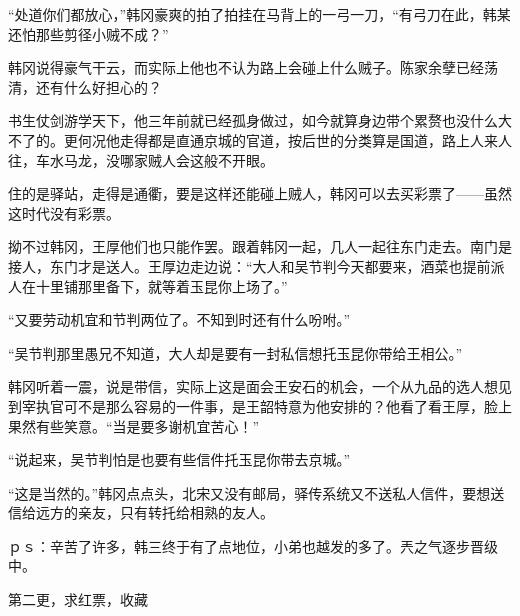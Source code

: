 “处道你们都放心，”韩冈豪爽的拍了拍挂在马背上的一弓一刀，“有弓刀在此，韩某还怕那些剪径小贼不成？”

韩冈说得豪气干云，而实际上他也不认为路上会碰上什么贼子。陈家余孽已经荡清，还有什么好担心的？

书生仗剑游学天下，他三年前就已经孤身做过，如今就算身边带个累赘也没什么大不了的。更何况他走得都是直通京城的官道，按后世的分类算是国道，路上人来人往，车水马龙，没哪家贼人会这般不开眼。

住的是驿站，走得是通衢，要是这样还能碰上贼人，韩冈可以去买彩票了——虽然这时代没有彩票。

拗不过韩冈，王厚他们也只能作罢。跟着韩冈一起，几人一起往东门走去。南门是接人，东门才是送人。王厚边走边说：“大人和吴节判今天都要来，酒菜也提前派人在十里铺那里备下，就等着玉昆你上场了。”

“又要劳动机宜和节判两位了。不知到时还有什么吩咐。”

“吴节判那里愚兄不知道，大人却是要有一封私信想托玉昆你带给王相公。”

韩冈听着一震，说是带信，实际上这是面会王安石的机会，一个从九品的选人想见到宰执官可不是那么容易的一件事，是王韶特意为他安排的？他看了看王厚，脸上果然有些笑意。“当是要多谢机宜苦心！”

“说起来，吴节判怕是也要有些信件托玉昆你带去京城。”

“这是当然的。”韩冈点点头，北宋又没有邮局，驿传系统又不送私人信件，要想送信给远方的亲友，只有转托给相熟的友人。

ｐｓ：辛苦了许多，韩三终于有了点地位，小弟也越发的多了。兲之气逐步晋级中。

第二更，求红票，收藏

